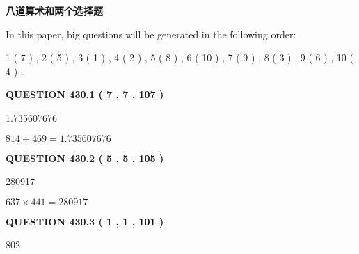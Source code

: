 \documentclass{ctexart}
\begin{document}
   
 \vspace{0.2in}
{\LARGE {\textbf{ 八道算术和两个选择题}}}
   
   
   
\vspace{0.2in}
   
In this paper, big questions will be generated in the following order: 
   
   
   1 ( 7 )
 ,
   2 ( 5 )
 ,
   3 ( 1 )
 ,
   4 ( 2 )
 ,
   5 ( 8 )
 ,
   6 ( 10 )
 ,
   7 ( 9 )
 ,
   8 ( 3 )
 ,
   9 ( 6 )
 ,
   10 ( 4 )
 .
  
\vspace{0.2in}
  
{\textbf{\Large{QUESTION
430.1 
 ( 7 , 7 , 107 )
}}}
  
  
 
 
\noindent{}

1.735607676
 
 
 
 
\noindent{}

$ %
814 \div  %
469=   %
1.735607676$
 
 
  
\vspace{0.2in}
  
{\textbf{\Large{QUESTION
430.2 
 ( 5 , 5 , 105 )
}}}
  
  
 
 
\noindent{}

280917
 
 
 
 
\noindent{}

$ %
637 \times  %
441=   %
280917$
 
 
  
\vspace{0.2in}
  
{\textbf{\Large{QUESTION
430.3 
 ( 1 , 1 , 101 )
}}}
  
  
 
 
\noindent{}

802
 
 
 
 
\noindent{}
\end{document}
